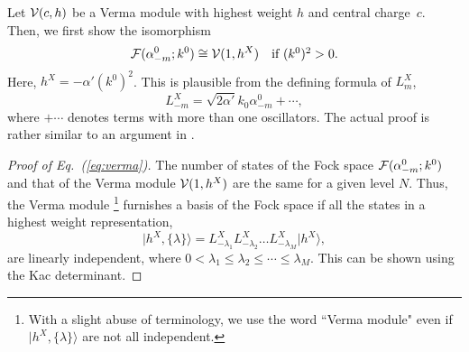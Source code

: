 \documentclass[a4paper,12pt]{article}
\newcommand{\ket}[1]{\mbox{$| #1 \rangle$}}
\newcommand{\eq}[1]{(\ref{eq:#1})}
\newcommand{\cond}[1]{\quad\mbox{#1}}
\begin{document}
Let ${\cal V}(c, h)$ be a Verma module 
with highest weight $h$ and central charge~$c$. 
Then, we first show the isomorphism
\begin{equation}
%
{\cal F}(\alpha^{0}_{-m};k^0) \cong {\cal V}(1, h^{X}) 
\cond{if $(k^0)^2>0$.}
\label{eq:verma}
%
\end{equation}
Here, $h^{X}=-\alpha'(k^0)^2$. This is plausible from the defining formula of $L^{X}_{m}$,
\begin{equation}
%
L^{X}_{-m} = \sqrt{2\alpha'} k_0 \alpha^{0}_{-m} + \cdots,
%
\end{equation}
where $+ \cdots$ denotes terms with more than one oscillators. The actual 
proof is rather similar to an argument in \cite{thorn1,Brower:1971qr}.

\begin{proof}[Proof of Eq.~\eq{verma}]
The number of states of the Fock space ${\cal F}(\alpha^{0}_{-m};
k^0)$ and that of the Verma module ${\cal V}(1, h^{X})$ are the same for
a given level $N$. Thus, the Verma module%
\footnote{With a slight abuse of terminology, we use the word ``Verma module" even if $\ket{{h^{X},\{\lambda\}}}$ are not all independent.} 
furnishes a basis of the Fock
space if all the states in a highest weight representation,
\begin{equation}
%
\ket{{h^{X},\{\lambda\}}} =
L^{X}_{-\lambda_1}  L^{X}_{-\lambda_2} \ldots L^{X}_{-\lambda_M} \ket{h^{X}},
%
\end{equation}
are linearly independent, where $ 0 < \lambda_{1} \leq \lambda_{2} \leq
\cdots \leq \lambda_{M} $. This can be shown using the Kac determinant.

%
%


\end{proof}
\end{document}
